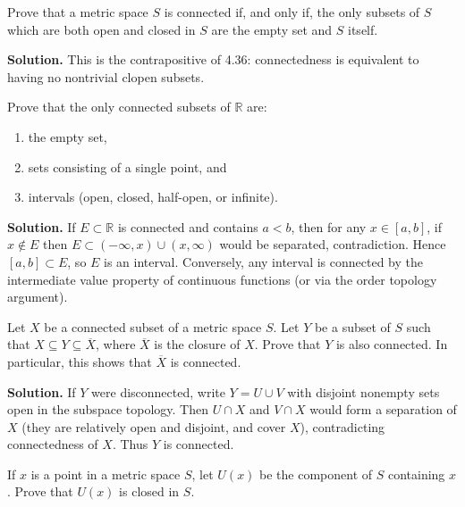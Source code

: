 \begin{problembox}
Prove that a metric space $S$ is connected if, and only if, the only subsets of $S$ which are both open and closed in $S$ are the empty set and $S$ itself.
\end{problembox}

\noindent\textbf{Solution.}
This is the contrapositive of 4.36: connectedness is equivalent to having no nontrivial clopen subsets.
\medskip

\begin{problembox}
Prove that the only connected subsets of $\mathbb{R}$ are:
\begin{enumerate}[label=(\alph*)]
\item the empty set,
\item sets consisting of a single point, and
\item intervals (open, closed, half-open, or infinite).
\end{enumerate}
\end{problembox}

\noindent\textbf{Solution.}
If $E\subset\mathbb{R}$ is connected and contains $a<b$, then for any $x\in[a,b]$, if $x\notin E$ then $E\subset(-\infty,x)\cup(x,\infty)$ would be separated, contradiction. Hence $[a,b]\subset E$, so $E$ is an interval. Conversely, any interval is connected by the intermediate value property of continuous functions (or via the order topology argument).
\medskip

\begin{problembox}
Let $X$ be a connected subset of a metric space $S$. Let $Y$ be a subset of $S$ such that $X \subseteq Y \subseteq \overline{X}$, where $\overline{X}$ is the closure of $X$. Prove that $Y$ is also connected. In particular, this shows that $\overline{X}$ is connected.
\end{problembox}

\noindent\textbf{Solution.}
If $Y$ were disconnected, write $Y=U\cup V$ with disjoint nonempty sets open in the subspace topology. Then $U\cap X$ and $V\cap X$ would form a separation of $X$ (they are relatively open and disjoint, and cover $X$), contradicting connectedness of $X$. Thus $Y$ is connected.
\medskip

\begin{problembox}
If $x$ is a point in a metric space $S$, let $U(x)$ be the component of $S$ containing $x$. Prove that $U(x)$ is closed in $S$.
\end{problembox}

